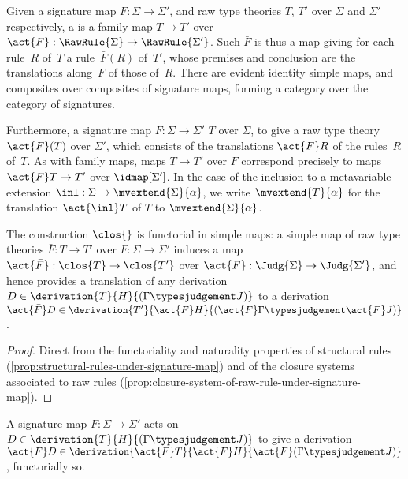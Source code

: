 \begin{definition}
  Given a signature map $F : \Sigma \to \Sigma'$, and raw type theories $T$, $T'$ over $\Sigma$ and $\Sigma'$ respectively, a  is a family map $T \to T'$ over $\act{F} : \RawRule{\Sigma} \to \RawRule{\Sigma'}$.
  Such $\bar{F}$ is thus a map giving for each rule~$R$ of~$T$ a rule~$\bar{F}(R)$ of~$T'$, whose premises and conclusion are the translations along~$F$ of those of~$R$.
  There are evident identity simple maps, and composites over composites of signature maps, forming a category over the category of signatures.

  Furthermore, a signature map $F : \Sigma \to \Sigma'$  $T$ over $\Sigma$, to give a raw type theory $\act{F}(T)$
  over $\Sigma'$, which consists of the translations $\act{F} R$ of the rules~$R$ of~$T$.
  As with family maps, maps $T \to T'$ over $F$ correspond precisely to maps $\act{F} T \to T'$ over $\idmap[\Sigma']$.
  In the case of the inclusion to a metavariable extension $\inl : \Sigma \to \mvextend{\Sigma}{\alpha}$, we write $\mvextend{T}{\alpha}$ for the translation $\act{{\inl}} T$ of $T$ to $\mvextend{\Sigma}{\alpha}$. 
\end{definition}

\begin{proposition}%
  \label{prop:cl-functorial-simple-maps} \label{prop:derivations-functorial-simple-maps}
  The construction $\clos{}$ is functorial in simple maps:
  a simple map of raw type theories $\bar{F} : T \to T'$ over $F : \Sigma \to \Sigma'$ induces a map $\act{\bar{F}} : \clos{T} \to \clos{T'}$ over $\act{F} : \Judg{\Sigma} \to \Judg{\Sigma'}$,
  and hence provides a translation of any derivation~$D \in \derivation{T}{H}{(\Gamma \typesjudgement J)}$ to a derivation $\act{\bar{F}} D \in \derivation{T'}{\act{F} H}{(\act{F} \Gamma \typesjudgement \act{F} J)}$.
\end{proposition}

\begin{proof}
  Direct from the functoriality and naturality properties of structural rules (\cref{prop:structural-rules-under-signature-map}) and of the closure systems associated to raw rules (\cref{prop:closure-system-of-raw-rule-under-signature-map}).
\end{proof}

\begin{corollary} \label{cor:derivations-functorial-signature-maps}
  A signature map $F : \Sigma \to \Sigma'$ acts on
  $D \in \derivation{T}{H}{(\Gamma \typesjudgement J)}$ to give a derivation
  $\act{F} D \in \derivation{\act{F} T}{\act{F} H}{\act{F}(\Gamma \typesjudgement J)}$, functorially so.
\end{corollary}

